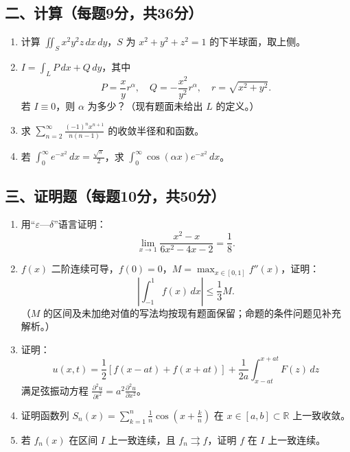 \documentclass[11pt,fontset=fandol]{ctexart}
\begin{document}
\subsection{二、计算（每题9分，共36分）}\label{ux4e8cux8ba1ux7b97ux6bcfux98989ux5206ux517136ux5206}

\begin{enumerate}
\def\labelenumi{\arabic{enumi}.}
\item
  计算 \(\displaystyle\iint_Sx^2y^2z\,dx\,dy\)，\(S\) 为
  \(x^2+y^2+z^2=1\) 的下半球面，取上侧。
\item
  \(\displaystyle I=\int_LP\,dx+Q\,dy\)，其中 \[
  P=\frac{x}{y}r^\alpha,\quad Q=-\frac{x^2}{y^2}r^\alpha,\quad r=\sqrt{x^2+y^2}.
  \] 若 \(I\equiv0\)，则 \(\alpha\) 为多少？（现有题面未给出 \(L\)
  的定义。）
\item
  求 \(\displaystyle\sum_{n=2}^\infty\frac{(-1)^nx^{n+1}}{n(n-1)}\)
  的收敛半径和和函数。
\item
  若 \(\displaystyle\int_0^\infty e^{-x^2}\,dx=\frac{\sqrt\pi}{2}\)，求
  \(\displaystyle\int_0^\infty\cos(\alpha x)e^{-x^2}\,dx\)。
\end{enumerate}

\subsection{三、证明题（每题10分，共50分）}\label{ux4e09ux8bc1ux660eux9898ux6bcfux989810ux5206ux517150ux5206}

\begin{enumerate}
\def\labelenumi{\arabic{enumi}.}
\item
  用``\(\varepsilon\)---\(\delta\)''语言证明： \[
  \lim_{x\to1}\frac{x^2-x}{6x^2-4x-2}=\frac18.
  \]
\item
  \(f(x)\)
  二阶连续可导，\(f(0)=0\)，\(\displaystyle M=\max_{x\in[0,1]}f''(x)\)，证明：
  \[
  \left|\int_{-1}^1f(x)\,dx\right|\le\frac13M.
  \] （\(M\)
  的区间及未加绝对值的写法均按现有题面保留；命题的条件问题见补充解析。）
\item
  证明： \[
  u(x,t)=\frac12[f(x-at)+f(x+at)]+\frac1{2a}\int_{x-at}^{x+at}F(z)\,dz
  \] 满足弦振动方程
  \(\displaystyle\frac{\partial^2u}{\partial t^2}=a^2\frac{\partial^2u}{\partial x^2}\)。
\item
  证明函数列
  \(\displaystyle S_n(x)=\sum_{k=1}^n\frac1n\cos\left(x+\frac kn\right)\)
  在 \(x\in[a,b]\subset\mathbb R\) 上一致收敛。
\item
  若 \(f_n(x)\) 在区间 \(I\) 上一致连续，且
  \(f_n\rightrightarrows f\)，证明 \(f\) 在 \(I\) 上一致连续。
\end{enumerate}
\end{document}
